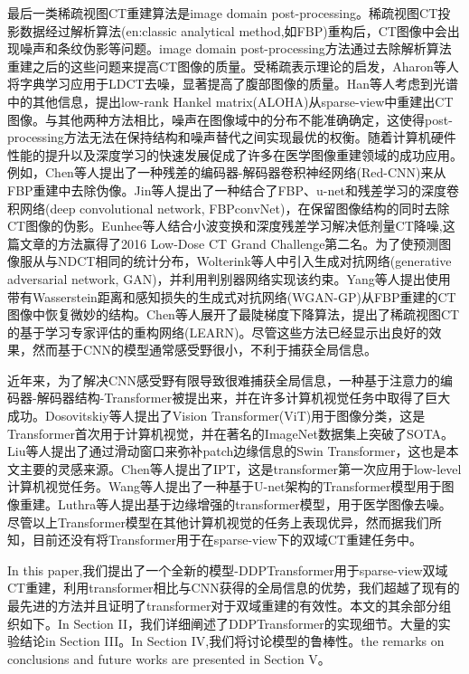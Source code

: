 最后一类稀疏视图CT重建算法是image domain post-processing。稀疏视图CT投影数据经过解析算法(en:classic analytical method,如FBP)重构后，CT图像中会出现噪声和条纹伪影等问题。image domain post-processing方法通过去除解析算法重建之后的这些问题来提高CT图像的质量。受稀疏表示理论的启发，Aharon等人将字典学习\cite{2006ksvd}应用于LDCT去噪，显著提高了腹部图像的质量。Han\cite{2016Sparse}等人考虑到光谱中的其他信息，提出low-rank Hankel matrix(ALOHA)从sparse-view中重建出CT图像。与其他两种方法相比，噪声在图像域中的分布不能准确确定，这使得post-processing方法无法在保持结构和噪声替代之间实现最优的权衡。随着计算机硬件性能的提升以及深度学习的快速发展促成了许多在医学图像重建领域的成功应用。例如，Chen等人\cite{redcnn}提出了一种残差的编码器-解码器卷积神经网络(Red-CNN)来从FBP重建中去除伪像。Jin等人\cite{2016FBPConvNet}提出了一种结合了FBP、u-net和残差学习的深度卷积网络(deep convolutional network, FBPconvNet)，在保留图像结构的同时去除CT图像的伪影。Eunhee等人\cite{8332971}结合小波变换和深度残差学习解决低剂量CT降噪,这篇文章的方法赢得了2016 Low-Dose CT Grand Challenge第二名。为了使预测图像服从与NDCT相同的统计分布，Wolterink等人\cite{2017Generative}中引入生成对抗网络(generative adversarial network, GAN)，并利用判别器网络实现该约束。Yang等人\cite{2018Low}提出使用带有Wasserstein距离和感知损失的生成式对抗网络(WGAN-GP)从FBP重建的CT图像中恢复微妙的结构。Chen等人\cite{2018LEARN}展开了最陡梯度下降算法，提出了稀疏视图CT的基于学习专家评估的重构网络(LEARN)。尽管这些方法已经显示出良好的效果，然而基于CNN的模型通常感受野很小，不利于捕获全局信息。\par

近年来，为了解决CNN感受野有限导致很难捕获全局信息，一种基于注意力的编码器-解码器结构-Transformer\cite{vaswani2017attention}被提出来，并在许多计算机视觉任务中取得了巨大成功。Dosovitskiy等人\cite{dosovitskiy2020vit}提出了Vision Transformer(ViT)用于图像分类，这是Transformer首次用于计算机视觉，并在著名的ImageNet数据集\cite{2009ImageNet}上突破了SOTA。Liu等人\cite{liu2021Swin}提出了通过滑动窗口来弥补patch边缘信息的Swin Transformer，这也是本文主要的灵感来源。Chen等人提出了IPT\cite{chen2021pre}，这是transformer第一次应用于low-level计算机视觉任务。Wang等人提出了一种基于U-net架构的Transformer模型\cite{wang2021uformer}用于图像重建。Luthra等人\cite{2021Eformer}提出基于边缘增强的transformer模型，用于医学图像去噪。尽管以上Transformer模型在其他计算机视觉的任务上表现优异，然而据我们所知，目前还没有将Transformer用于在sparse-view下的双域CT重建任务中。

In this paper,我们提出了一个全新的模型-DDPTransformer用于sparse-view双域CT重建，利用transformer相比与CNN获得的全局信息的优势，我们超越了现有的最先进的方法并且证明了transformer对于双域重建的有效性。本文的其余部分组织如下。In Section II，我们详细阐述了DDPTransformer的实现细节。大量的实验结论in Section III。In Section IV,我们将讨论模型的鲁棒性。the remarks on conclusions and future works are presented in Section V。\par
